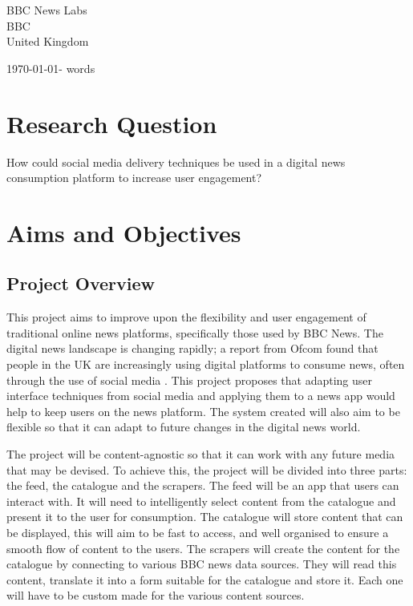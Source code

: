 \documentclass[12pt,titlepage]{article}
\newcommand\wordcount{}
\begin{document}
\begin{titlepage}
\begin{center}
\begin{multicols}{2}
  		BBC News Labs\\
  		BBC\\
  		United Kingdom\\

    \end{multicols}

    \today - \wordcount words

	\end{center}
\end{titlepage}


\tableofcontents
\newpage

\section{Research Question}

How could social media delivery techniques be used in a digital news consumption platform to increase user engagement?

\section{Aims and Objectives}

  \subsection{Project Overview}

  This project aims to improve upon the flexibility and user engagement of
  traditional online news platforms, specifically those used by BBC News. The
  digital news landscape is changing rapidly; a report from Ofcom found that
  people in the UK are increasingly using digital platforms to consume news,
  often through the use of social media \cite{ofcom}. This project proposes that
  adapting user interface techniques from social media and applying them to a
  news app would help to keep users on the news platform. The system created
  will also aim to be flexible so that it can adapt to future changes in the
  digital news world.

  The project will be content-agnostic so that it can work with any future media
  that may be devised. To achieve this, the project will be divided into three
  parts: the feed, the catalogue and the scrapers. The feed will be an app that
  users can interact with. It will need to intelligently select content from the
  catalogue and present it to the user for consumption. The catalogue will store
  content that can be displayed, this will aim to be fast to access, and well
  organised to ensure a smooth flow of content to the users. The scrapers will
  create the content for the catalogue by connecting to various BBC news data
  sources. They will read this content, translate it into a form suitable for
  the catalogue and store it. Each one will have to be custom made for the
  various content sources.
\end{document}
